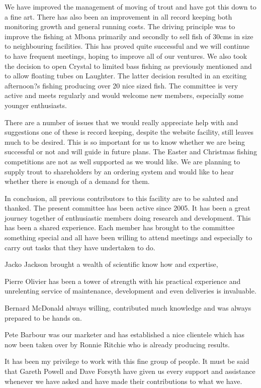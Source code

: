 We have improved the management of moving of trout and have got this down to a fine art. 
There has also been an improvement in all record keeping both monitoring growth and general running costs. 
The driving principle was to improve the fishing at Mbona primarily and secondly to sell fish of 30cms in size to neighbouring facilities. 
This has proved quite successful and we will continue to have frequent meetings, hoping to improve all of our ventures. 
We also took the decision to open Crystal to limited bass fishing as previously mentioned and to allow floating tubes on Laughter. 
The latter decision resulted in an exciting afternoon?s fishing producing over 20 nice sized fish. 
The committee is very active and meets regularly and would welcome new members, especially some younger enthusiasts.

There are a number of issues that we would really appreciate help with and suggestions one of  these is record keeping, despite the website facility, still leaves much to be desired. This is so important for us to know whether we are being successful or not and will guide in future plans. The Easter and Christmas fishing competitions are not as well supported as we would like. We are planning to supply trout to shareholders by an ordering system and would like to hear whether there is enough of a demand for them.

In conclusion, all previous contributors to this facility are to be saluted and thanked. 
The present committee has been active since 2005. It has been a great journey together of enthusiastic members 
doing research and development. This has been a shared experience. Each member has brought to the 
committee something special and all have been willing to attend meetings and especially to carry out tasks that they have undertaken to do. 

Jacko Jackson brought a wealth of scientific know how and expertise, 

Pierre Olivier has been a tower of strength with his practical experience and unrelenting service of maintenance, 
development and even deliveries is invaluable. 

Bernard McDonald always willing, contributed much knowledge and was always prepared to be hands on. 

Pete Barbour was our marketer and has established a nice clientele which has now been taken over by Ronnie Ritchie who is already producing results. 

It has been my privilege to work with this fine group of people. It must be said that Gareth Powell and Dave Forsyth have given us every support and assistance whenever we have asked and have made their contributions to what we have. 

